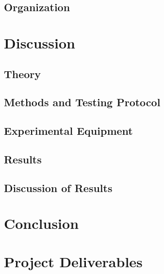 \documentclass[amsmath, amssymb, aps, pra, 12pt]{revtex4-1}
\begin{document}
\subsection{\label{sec:introduction:organization}Organization}



\section{\label{sec:discussion}Discussion}


\subsection{\label{sec:discussion:theory}Theory}


\subsection{\label{sec:discussion:testing}Methods and Testing Protocol}


\subsection{\label{sec:discussion:equipment}Experimental Equipment}


\subsection{\label{sec:discussion:results}Results}


\subsection{\label{sec:discussion:resultdiscussion}Discussion of Results}



\section{\label{sec:conclusion}Conclusion}



\section{\label{sec:projectdeliverables}Project Deliverables}

\end{document}
